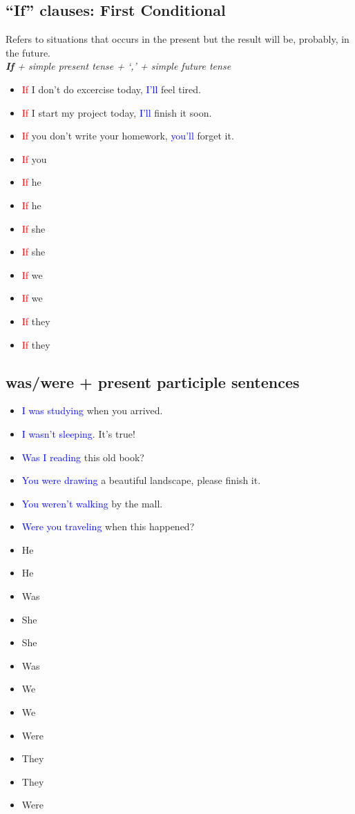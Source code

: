 \subsection{``If'' clauses: First Conditional}
\begin{multicols}{2}
Refers to situations that occurs in the present but the result will be, probably, in the future.\\
\emph{\textbf{If} + simple present tense + `,' + simple future tense}
\begin{itemize}
\item \textcolor{red}{If} I don't do excercise today, \textcolor{blue}{I'll} feel tired.
\item \textcolor{red}{If} I start my project today, \textcolor{blue}{I'll} finish it soon.
\item \textcolor{red}{If} you don't write your homework, \textcolor{blue}{you'll} forget it.
\item \textcolor{red}{If} you
\item \textcolor{red}{If} he
\item \textcolor{red}{If} he
\item \textcolor{red}{If} she
\item \textcolor{red}{If} she
\item \textcolor{red}{If} we
\item \textcolor{red}{If} we
\item \textcolor{red}{If} they
\item \textcolor{red}{If} they
\end{itemize}
\end{multicols}

\subsection{was/were + present participle sentences}
\begin{multicols}{2}
\begin{itemize}
\item \textcolor{blue}{I was studying} when you arrived.
\item \textcolor{blue}{I wasn't sleeping}. It's true!
\item \textcolor{blue}{Was I reading} this old book?
\item \textcolor{blue}{You were drawing} a beautiful landscape, please finish it.
\item \textcolor{blue}{You weren't walking} by the mall.
\item \textcolor{blue}{Were you traveling} when this happened?
\item He
\item He
\item Was
\item She
\item She
\item Was
\item We
\item We
\item Were
\item They
\item They
\item Were
\end{itemize}
\end{multicols}

